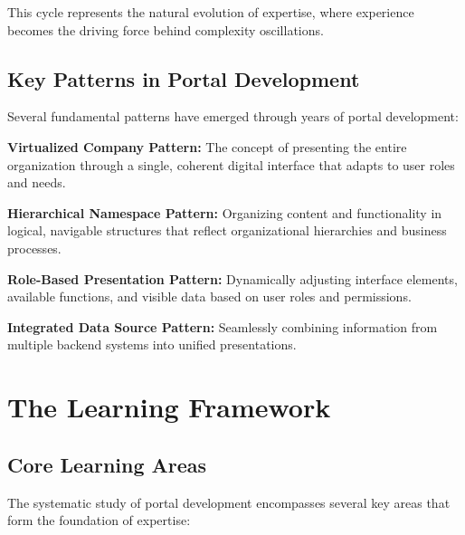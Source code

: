 This cycle represents the natural evolution of expertise, where experience becomes the driving force behind complexity oscillations.

\subsection{Key Patterns in Portal Development}

Several fundamental patterns have emerged through years of portal development:

\textbf{Virtualized Company Pattern:} The concept of presenting the entire organization through a single, coherent digital interface that adapts to user roles and needs.

\textbf{Hierarchical Namespace Pattern:} Organizing content and functionality in logical, navigable structures that reflect organizational hierarchies and business processes.

\textbf{Role-Based Presentation Pattern:} Dynamically adjusting interface elements, available functions, and visible data based on user roles and permissions.

\textbf{Integrated Data Source Pattern:} Seamlessly combining information from multiple backend systems into unified presentations.

\section{The Learning Framework}

\subsection{Core Learning Areas}

The systematic study of portal development encompasses several key areas that form the foundation of expertise:

